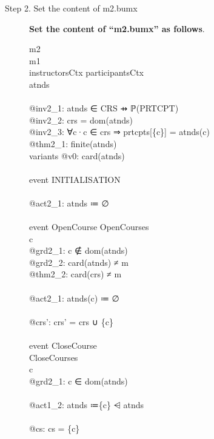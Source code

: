 \begin{description}
\item[Step 2. Set the content of m2.bumx] \textbf{Set the content of ``m2.bumx'' as follows}.
  \begin{center}
    \begin{Bcode}
      \ifplastex
      \Bmachine{} m2\\
      \Brefines{} m1\\
      \Bsees{} instructorsCtx participantsCtx\\
      \Bvariables{} atnds\\
      \Binvariants\\
      @inv2_1: atnds ∈ CRS ⇸ ℙ(PRTCPT)\\
      @inv2_2: crs = dom(atnds)\\
      @inv2_3: ∀c·c ∈ crs ⇒ prtcpts[\{c\}] = atnds(c)\\
      \Btheorem{} @thm2_1: finite(atnds)\\
      variants @v0: card(atnds)\\
      \Bevents\\
      event INITIALISATION\\
      \Bthen \\
      @act2_1: atnds ≔ ∅\\
      \Bend\\
      event OpenCourse \Brefines{} OpenCourses\\
      \Bany{} c \Bwhere\\
      @grd2_1: c ∉ dom(atnds)\\
      @grd2_2: card(atnds) ≠ m \\
      \Btheorem{} @thm2_2: card(crs) ≠ m\\
      \Bthen\\
      @act2_1: atnds(c) ≔ ∅\\
      \Bwith\\
      @crs': crs' = crs ∪ \{c\}\\
      \Bend\\
      \Bconvergent{} event CloseCourse \\
      \Brefines{} CloseCourses\\
      \Bany{} c \Bwhere\\
      @grd2_1: c ∈ dom(atnds)\\
      \Bthen\\
      @act1_2: atnds ≔\{c\} ⩤ atnds\\
      \Bwith\\
      @cs: cs = \{c\}\\
      \Bend\\

\end{Bcode}
\end{center}
\end{description}
